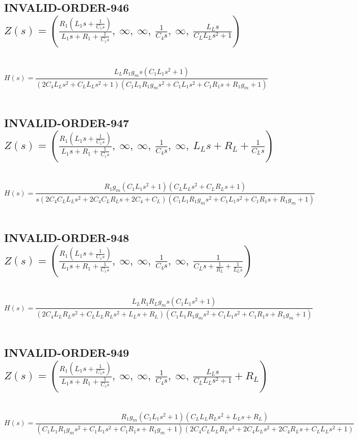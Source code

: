 \documentclass{article}
\begin{document}
\subsection{INVALID-ORDER-946 $Z(s) = \left( \frac{R_{1} \left(L_{1} s + \frac{1}{C_{1} s}\right)}{L_{1} s + R_{1} + \frac{1}{C_{1} s}}, \  \infty, \  \infty, \  \frac{1}{C_{4} s}, \  \infty, \  \frac{L_{L} s}{C_{L} L_{L} s^{2} + 1}\right)$ } \ 
\textbf{\[H(s) = \frac{L_{L} R_{1} g_{m} s \left(C_{1} L_{1} s^{2} + 1\right)}{\left(2 C_{4} L_{L} s^{2} + C_{L} L_{L} s^{2} + 1\right) \left(C_{1} L_{1} R_{1} g_{m} s^{2} + C_{1} L_{1} s^{2} + C_{1} R_{1} s + R_{1} g_{m} + 1\right)}\] } \ 
\subsection{INVALID-ORDER-947 $Z(s) = \left( \frac{R_{1} \left(L_{1} s + \frac{1}{C_{1} s}\right)}{L_{1} s + R_{1} + \frac{1}{C_{1} s}}, \  \infty, \  \infty, \  \frac{1}{C_{4} s}, \  \infty, \  L_{L} s + R_{L} + \frac{1}{C_{L} s}\right)$ } \ 
\textbf{\[H(s) = \frac{R_{1} g_{m} \left(C_{1} L_{1} s^{2} + 1\right) \left(C_{L} L_{L} s^{2} + C_{L} R_{L} s + 1\right)}{s \left(2 C_{4} C_{L} L_{L} s^{2} + 2 C_{4} C_{L} R_{L} s + 2 C_{4} + C_{L}\right) \left(C_{1} L_{1} R_{1} g_{m} s^{2} + C_{1} L_{1} s^{2} + C_{1} R_{1} s + R_{1} g_{m} + 1\right)}\] } \ 
\subsection{INVALID-ORDER-948 $Z(s) = \left( \frac{R_{1} \left(L_{1} s + \frac{1}{C_{1} s}\right)}{L_{1} s + R_{1} + \frac{1}{C_{1} s}}, \  \infty, \  \infty, \  \frac{1}{C_{4} s}, \  \infty, \  \frac{1}{C_{L} s + \frac{1}{R_{L}} + \frac{1}{L_{L} s}}\right)$ } \ 
\textbf{\[H(s) = \frac{L_{L} R_{1} R_{L} g_{m} s \left(C_{1} L_{1} s^{2} + 1\right)}{\left(2 C_{4} L_{L} R_{L} s^{2} + C_{L} L_{L} R_{L} s^{2} + L_{L} s + R_{L}\right) \left(C_{1} L_{1} R_{1} g_{m} s^{2} + C_{1} L_{1} s^{2} + C_{1} R_{1} s + R_{1} g_{m} + 1\right)}\] } \ 
\subsection{INVALID-ORDER-949 $Z(s) = \left( \frac{R_{1} \left(L_{1} s + \frac{1}{C_{1} s}\right)}{L_{1} s + R_{1} + \frac{1}{C_{1} s}}, \  \infty, \  \infty, \  \frac{1}{C_{4} s}, \  \infty, \  \frac{L_{L} s}{C_{L} L_{L} s^{2} + 1} + R_{L}\right)$ } \ 
\textbf{\[H(s) = \frac{R_{1} g_{m} \left(C_{1} L_{1} s^{2} + 1\right) \left(C_{L} L_{L} R_{L} s^{2} + L_{L} s + R_{L}\right)}{\left(C_{1} L_{1} R_{1} g_{m} s^{2} + C_{1} L_{1} s^{2} + C_{1} R_{1} s + R_{1} g_{m} + 1\right) \left(2 C_{4} C_{L} L_{L} R_{L} s^{3} + 2 C_{4} L_{L} s^{2} + 2 C_{4} R_{L} s + C_{L} L_{L} s^{2} + 1\right)}\] } \ 
\end{document}
